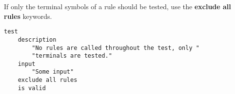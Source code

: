 

If only the terminal symbols of a rule should be tested, use the 
\textbf{exclude all rules} keywords.

\begin{lstlisting}[style = SrtL]
test
    description
        "No rules are called throughout the test, only "
        "terminals are tested."
    input 
        "Some input"
    exclude all rules
    is valid
\end{lstlisting}